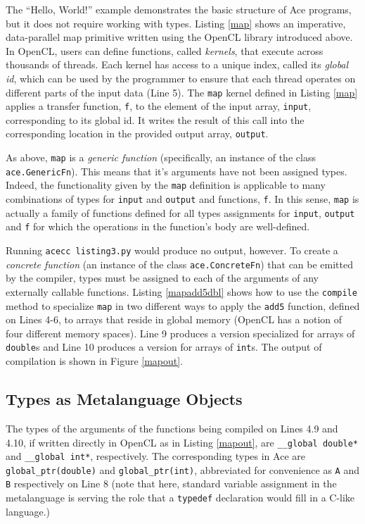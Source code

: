 \documentclass[10pt, conference, compsocconf]{IEEEtran}
\begin{document}
The ``Hello, World!'' example demonstrates the basic structure of Ace programs, but it does not require working with types. Listing \ref{map} shows an imperative, data-parallel map primitive written using the OpenCL library introduced above. In OpenCL, users can define functions, called {\em kernels}, that execute across thousands of threads. Each kernel has access to a unique index, called its {\em global id}, which can be used by the programmer to ensure that each thread operates on different parts of the input data (Line 5). The \verb|map| kernel defined in Listing \ref{map} applies a transfer function, \verb|f|, to the element of the input array, \verb|input|, corresponding to its global id. It writes the result of this call into the corresponding location in the provided output array, \verb|output|.

As above, \verb|map| is a {\em generic function} (specifically, an instance of the class \verb|ace.GenericFn|). This means that it's arguments have not been assigned types. Indeed, the functionality given by the \verb|map| definition is applicable to many combinations of types for \verb|input| and \verb|output| and functions, \verb|f|. In this sense, \verb|map| is actually a family of functions defined for all types assignments for \verb|input|, \verb|output| and \verb|f| for which the operations in the function's body are well-defined.

Running \verb|acecc listing3.py| would produce no output, however. To create a {\em concrete function} (an instance of the class \verb|ace.ConcreteFn|) that can be emitted by the compiler, types must be assigned to each of the arguments of any externally callable functions. Listing \ref{mapadd5dbl} shows how to use the \verb|compile| method to specialize \verb|map| in two different ways to apply the \verb|add5| function, defined on Lines 4-6, to arrays  that reside in global memory (OpenCL has a notion of four different memory spaces). Line 9 produces a version specialized for arrays of \verb|double|s and Line 10 produces a version for arrays of \verb|int|s. The output of compilation is shown in Figure \ref{mapout}.

\subsection{Types as Metalanguage Objects}
The types of the arguments of the functions being compiled on Lines 4.9 and 4.10, if written directly in OpenCL as in Listing \ref{mapout}, are \verb|__global double*| and \verb|__global int*|, respectively. The corresponding types in Ace are \verb|global_ptr(double)| and \verb|global_ptr(int)|, abbreviated for convenience as \verb|A| and \verb|B| respectively on Line 8 (note that here, standard variable assignment in the metalanguage is serving the role that a \verb|typedef| declaration would fill in a C-like language.)
\end{document}
